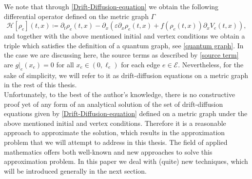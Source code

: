 We note that through \cref{Drift-Diffusion-equation} we obtain the following differential operator defined on the metric graph $\Gamma$
\begin{equation} 
    \label{eq:Hamiltonian}
    \mathcal{H} [\rho_e]  \left( t,x \right)  \coloneqq \partial_t \rho_e  \left( t,x \right)   - \partial_x  \left( \varepsilon \partial_x \rho_e  \left( t,x \right)  + f \left( \rho_e  \left( t,x \right)   \right)  \partial_x V_e  \left( t,x \right)  \right) ,
\end{equation}
and together with the above mentioned initial and vertex conditions we obtain a triple which satisfies the definition of a quantum graph, see \cref{quantum graph}. In the case we are discussing here, the source terms as described by \cref{source term} are $g|_e(x_e) = 0$ for all $ x_e \in (0, \ell_e)$ for each edge $e \in \mathcal{E}$. Nevertheless, for the sake of simplicity, we will refer to it as drift-diffusion equations on a metric graph in the rest of this thesis. \\
Unfortunately, to the best of the author's knowledge, there is no constructive proof yet of any form of an analytical solution of the set of drift-diffusion equations given by \cref{Drift-Diffusion-equation} defined on a metric graph under the above mentioned initial and vertex conditions. Therefore it is a reasonable approach to approximate the solution, which results in the approximation problem that we will attempt to address in this thesis. The field of applied mathematics offers both well-known and new approaches to solve this approximation problem. In this paper we deal with (quite) new techniques, which will be introduced generally in the next section. 




